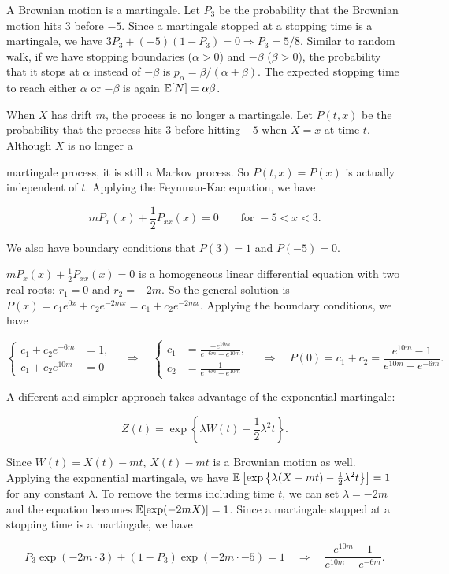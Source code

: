 \begin{solution}
A Brownian motion is a martingale. Let $P_3$ be the probability that the Brownian motion
hits 3 before $-5$. Since a martingale stopped at a stopping time is a martingale, we
have $3P_3+(-5)(1-P_3)=0\Rightarrow P_3=5/8$. Similar to random walk, if we have
stopping boundaries ($\alpha>0$) and $-\beta$ ($\beta>0$), the probability that it stops
at $\alpha$ instead of $-\beta$ is $p_\alpha=\beta/(\alpha+\beta)$. The expected stopping
 time to reach either $\alpha$ or $-\beta$ is again $\mathbb{E}[N]=\alpha\beta$.

When $X$ has drift $m$, the process is no longer a martingale. Let $P(t,x)$ be the
probability that the process hits 3 before hitting $-5$ when $X=x$ at time $t$. Although
$X$ is no longer a


martingale process, it is still a Markov process. So $P(t,x)=P(x)$ is actually independent
of $t$. Applying the Feynman-Kac equation\footnotemark[4], we have

\[
mP_x(x)+\frac{1}{2}P_{xx}(x)=0\qquad\text{for }-5<x<3.
\]

We also have boundary conditions that $P(3)=1$ and $P(-5)=0$.

$mP_x(x)+\frac{1}{2}P_{xx}(x)=0$ is a homogeneous linear differential equation with two
real roots: $r_1=0$ and $r_2=-2m$. So the general solution is
$P(x)=c_1e^{0x}+c_2e^{-2mx}=c_1+c_2e^{-2mx}$. Applying the boundary conditions, we
have

\[
\left\{
\begin{aligned}
c_1+c_2e^{-6m}&=1,\\
c_1+c_2e^{10m}&=0
\end{aligned}
\right.
\quad\Rightarrow\quad
\left\{
\begin{aligned}
c_1&=\frac{-e^{10m}}{e^{-6m}-e^{10m}},\\
c_2&=\frac{1}{e^{-6m}-e^{10m}}
\end{aligned}
\right.
\quad\Rightarrow\quad
P(0)=c_1+c_2=\frac{e^{10m}-1}{e^{10m}-e^{-6m}}.
\]

A different and simpler approach takes advantage of the exponential martingale:

\[
Z(t)=\exp\left\{\lambda W(t)-\frac{1}{2}\lambda^2t\right\}.
\]

Since $W(t)=X(t)-mt$, $X(t)-mt$ is a Brownian motion as well. Applying the exponential
martingale, we have
$\mathbb{E}\left[\exp\left\{\lambda(X-mt)-\frac{1}{2}\lambda^2t\right\}\right]=1$ for any
constant $\lambda$. To remove the terms including time $t$, we can set $\lambda=-2m$ and
the equation becomes $\mathbb{E}[\exp(-2mX)]=1$. Since a martingale stopped at a stopping time is
a martingale, we have

\[
P_3\exp(-2m\cdot3)+(1-P_3)\exp(-2m\cdot-5)=1
\quad\Rightarrow\quad
\frac{e^{10m}-1}{e^{10m}-e^{-6m}}.
\]

\end{solution}


